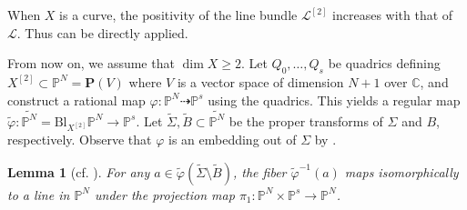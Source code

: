 \documentclass[a4paper]{amsart}
\numberwithin{equation}{section}
\theoremstyle{plain}
\newtheorem{lem}[thm]{Lemma}
\theoremstyle{definition}
\theoremstyle{remark}
\numberwithin{figure}{section}
\numberwithin{table}{section}
\numberwithin{equation}{section}
\def \CC {\mathbb{C}}
\def \PP {\mathbb{P}}
\def \Lcal {\mathcal{L}}
\def \Pbf {\mathbf{P}}
\begin{document}
When $X$ is a curve, the positivity of the line bundle $\Lcal^{[2]}$ increases with that of $\Lcal$.
Thus \cite[Corollary~3.10]{Vermeire2001} can be directly applied.

From now on, we assume that $\dim X \geq 2$.
Let $Q_0, \dots, Q_s$ be quadrics defining $X^{[2]} \subset \PP^N = \Pbf(V)$ where $V$ is a vector space of dimension $N+1$ over $\CC$, and construct a rational map $\varphi:\PP^N \dashrightarrow \PP^s$ using the quadrics.
This yields a regular map $\widetilde{\varphi}:\widetilde{\PP^N} = \mathrm{Bl}_{X^{[2]}} \PP^N \rightarrow \PP^s$.
Let $\widetilde{\Sigma}, \widetilde{B} \subset \widetilde{\PP^N}$ be the proper transforms of $\Sigma$ and $B$, respectively.
Observe that $\varphi$ is an embedding out of $\Sigma$ by \cite[Remark~2.11]{Vermeire2001}.

\begin{lem}[cf. {\cite[Remark~3.4]{Vermeire2001}}] \label{lem:fiber-of-blowup-of-secant}
    For any $a \in \widetilde{\varphi}(\widetilde{\Sigma} \setminus \widetilde{B})$, the fiber $\widetilde{\varphi}^{-1}(a)$ maps isomorphically to a line in $\PP^N$ under the projection map $\pi_1:\PP^N \times \PP^s \rightarrow \PP^N$.
\end{lem}
\end{document}
